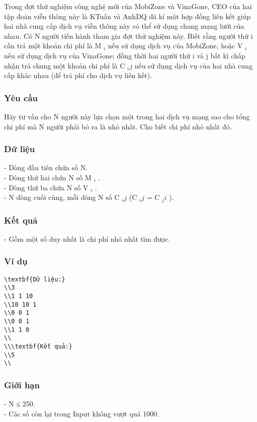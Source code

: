







   Trong đợt thử nghiệm công nghệ mới của MobiZone và VinaGone, CEO của hai tập đoàn viễn thông này là KTuấn và AnhDQ đã kí một hợp đồng liên kết giúp hai nhà cung cấp dịch vụ viễn thông này có thể sử dụng chung mạng lưới của nhau. Có N người tiến hành tham gia đợt thử nghiệm này. Biết rằng người thứ i cần trả một khoản chi phí là M   $_    i   $   nếu sử dụng dịch vụ của MobiZone, hoặc V   $_    i   $   nếu sử dụng dịch vụ của VinaGone; đồng thời hai người thứ i và j bất kì chấp nhận trả chung một khoản chi phí là C   $_    ij   $   nếu sử dụng dịch vụ của hai nhà cung cấp khác nhau (để trả phí cho dịch vụ liên kết).  

\subsubsection{   Yêu cầu  }

   Hãy tư vấn cho N người này lựa chọn một trong hai dịch vụ mạng sao cho tổng chi phí mà N người phải bỏ ra là nhỏ nhất. Cho biết chi phí nhỏ nhất đó.  

\subsubsection{   Dữ liệu  }

   - Dòng đầu tiên chứa số N.   
\\   - Dòng thứ hai chứa N số M   $_    i   $   .   
\\   - Dòng thứ ba chứa N số V   $_    i   $   .   
\\   - N dòng cuối cùng, mỗi dòng N số C   $_    ij   $   (C   $_    ij   $   = C   $_    ji   $   ).  

\subsubsection{   Kết quả  }

   - Gồm một số duy nhất là chi phí nhỏ nhất tìm được.  

\subsubsection{   Ví dụ  }
\begin{verbatim}
\textbf{Dữ liệu:}
\\3
\\1 1 10
\\10 10 1
\\0 0 1
\\0 0 1
\\1 1 0
\\
\\\textbf{Kết quả:}
\\5
\\\end{verbatim}

\subsubsection{   Giới hạn  }

   - N ≤ 250.   
\\   - Các số còn lại trong Input không vượt quá 1000.  

